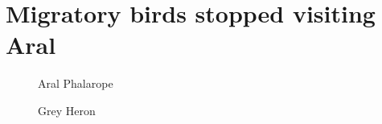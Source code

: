 

\chapter{Migratory birds stopped visiting Aral}
\label{cp:aral-birds}

\begin{figure}[htbp]
  \centering
  \begin{minipage}[b]{0.45\textwidth}
    \centering
    \caption{Aral Phalarope}
    \label{fig:aral-phalarope}
  \end{minipage}
  \hfill
  \begin{minipage}[b]{0.45\textwidth}
    \centering
    \caption{Grey Heron}
    \label{fig:heron}
  \end{minipage}
\end{figure}

